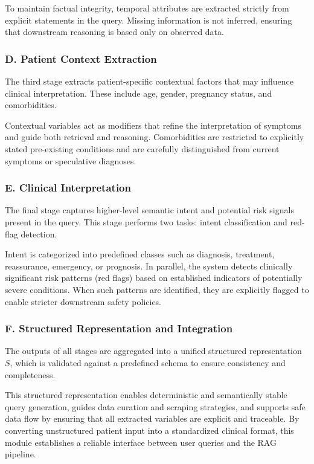\documentclass[conference, anonymous]{IEEEtran}
\begin{document}
To maintain factual integrity, temporal attributes are extracted strictly from explicit statements in the query. Missing information is not inferred, ensuring that downstream reasoning is based only on observed data.

\subsubsection{D. Patient Context Extraction}

The third stage extracts patient-specific contextual factors that may influence clinical interpretation. These include age, gender, pregnancy status, and comorbidities.

Contextual variables act as modifiers that refine the interpretation of symptoms and guide both retrieval and reasoning. Comorbidities are restricted to explicitly stated pre-existing conditions and are carefully distinguished from current symptoms or speculative diagnoses.

\subsubsection{E. Clinical Interpretation}

The final stage captures higher-level semantic intent and potential risk signals present in the query. This stage performs two tasks: intent classification and red-flag detection.

Intent is categorized into predefined classes such as diagnosis, treatment, reassurance, emergency, or prognosis. In parallel, the system detects clinically significant risk patterns (red flags) based on established indicators of potentially severe conditions. When such patterns are identified, they are explicitly flagged to enable stricter downstream safety policies.

\subsubsection{F. Structured Representation and Integration}

The outputs of all stages are aggregated into a unified structured representation $S$, which is validated against a predefined schema to ensure consistency and completeness.

This structured representation enables deterministic and semantically stable query generation, guides data curation and scraping strategies, and supports safe data flow by ensuring that all extracted variables are explicit and traceable. By converting unstructured patient input into a standardized clinical format, this module establishes a reliable interface between user queries and the RAG pipeline.
\end{document}
